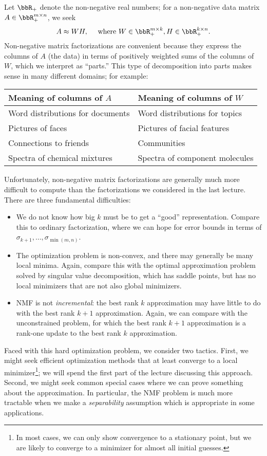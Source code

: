 \documentclass[12pt, leqno]{article} %
\begin{document}
Let $\bbR_+$ denote the non-negative real numbers; for a non-negative
data matrix $A \in \bbR_+^{m \times n}$, we seek
\[
  A \approx WH, \quad \mbox{ where }
  W \in \bbR_+^{m \times k}, 
  H \in \bbR_+^{k \times n}.
\]
Non-negative matrix factorizations are convenient because they express
the columns of $A$ (the data) in terms of positively weighted sums of
the columns of $W$, which we interpret as ``parts.''  This type of
decomposition into parts makes sense in many different domains; for
example:
\begin{center}
  \begin{tabular}{l|l}
    Meaning of columns of $A$ & Meaning of columns of $W$
    \\ \hline
    Word distributions for documents &
    Word distributions for topics
    \\
    Pictures of faces &
    Pictures of facial features
    \\
    Connections to friends &
    Communities \\
    Spectra of chemical mixtures &
    Spectra of component molecules
  \end{tabular}
\end{center}
Unfortunately, non-negative matrix factorizations are generally much
more difficult to compute than the factorizations we considered in the
last lecture.  There are three fundamental difficulties:
\begin{itemize}
\item
  We do not know how big $k$ must be to get a ``good'' representation.
  Compare this to ordinary factorization, where we can hope for error
  bounds in terms of $\sigma_{k+1}, \ldots, \sigma_{\min(m,n)}$.
\item
  The optimization problem is non-convex, and there may generally be
  many local minima.  Again, compare this with the optimal
  approximation problem solved by singular value decomposition, which
  has saddle points, but has no local minimizers that are not also
  global minimizers.
\item
  NMF is not {\em incremental}: the best rank $k$ approximation may
  have little to do with the best rank $k+1$ approximation.  Again,
  we can compare with the unconstrained problem, for which
  the best rank $k+1$ approximation is a rank-one update to the best
  rank $k$ approximation.
\end{itemize}
Faced with this hard optimization problem, we consider two tactics.
First, we might seek efficient optimization methods that at least
converge to a local minimizer\footnote{%
  In most cases, we can only show convergence to a stationary point,
  but we are likely to converge to a minimizer for almost all initial
  guesses.};
we will spend the first part of the lecture discussing this approach.
Second, we might seek common special cases where we can prove
something about the approximation.  In particular, the NMF problem
is much more tractable when we make a {\em separability} assumption
which is appropriate in some applications.
\end{document}
